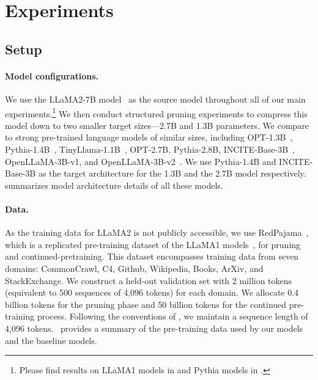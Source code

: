 
\section{Experiments}
\subsection{Setup}


\paragraph{Model configurations.}
We use the LLaMA2-7B model~\citep{touvron2023llama2} as the source model throughout all of our main experiments.\footnote{Please find results on LLaMA1 models in  and Pythia models in .} We then conduct structured pruning experiments to compress this model down to two smaller target sizes---2.7B and 1.3B parameters. We compare to strong pre-trained language models of similar sizes, 
including 
OPT-1.3B~\citep{zhang2022opt}, Pythia-1.4B~\citep{biderman2023pythia}, TinyLlama-1.1B~\citep{zhang2024tinyllama},
OPT-2.7B, Pythia-2.8B, INCITE-Base-3B~\citep{together2023redpajama}, 
OpenLLaMA-3B-v1, and OpenLLaMA-3B-v2~\citep{openlm2023openllama}. 
We use Pythia-1.4B and INCITE-Base-3B as the target architecture for the 1.3B and the 2.7B model respectively.~
summarizes model architecture details of all these models.




\paragraph{Data.} 
As the training data for LLaMA2 is not publicly accessible, we use RedPajama~\citep{together2023redpajama}, which is a replicated pre-training dataset of the LLaMA1 models~\citep{touvron2023llama}, for pruning and continued-pretraining. This dataset encompasses training data from seven domains: CommonCrawl, C4, Github, Wikipedia, Books, ArXiv, and StackExchange. We construct a held-out validation set with 2 million tokens (equivalent to 500 sequences of 4,096 tokens) for each domain. We allocate 0.4 billion tokens for the pruning phase and 50 billion tokens for the continued pre-training process. Following the conventions of \llamat, we maintain a sequence length of 4,096 tokens.~ provides a summary of the pre-training data used by our models and the baseline models.


